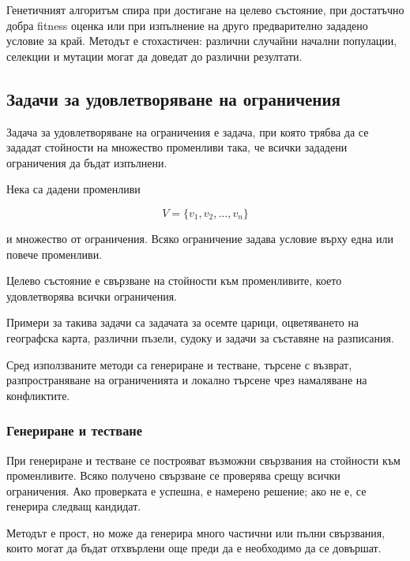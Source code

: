 Генетичният алгоритъм спира при достигане на целево състояние, при достатъчно добра fitness оценка или при изпълнение на друго предварително зададено условие за край. Методът е стохастичен: различни случайни начални популации, селекции и мутации могат да доведат до различни резултати.

\subsection{Задачи за удовлетворяване на ограничения}\label{s:25.1.5}

\begin{defn}
Задача за удовлетворяване на ограничения е задача, при която трябва да се зададат стойности на множество променливи така, че всички зададени ограничения да бъдат изпълнени.
\end{defn}

Нека са дадени променливи

\[
V=\{v_1,v_2,\ldots,v_n\}
\]

и множество от ограничения. Всяко ограничение задава условие върху една или повече променливи.

\begin{defn}
Целево състояние е свързване на стойности към променливите, което удовлетворява всички ограничения.
\end{defn}

Примери за такива задачи са задачата за осемте царици, оцветяването на географска карта, различни пъзели, судоку и задачи за съставяне на разписания.

Сред използваните методи са генериране и тестване, търсене с възврат, разпространяване на ограниченията и локално търсене чрез намаляване на конфликтите.

\subsubsection{Генериране и тестване}

При генериране и тестване се построяват възможни свързвания на стойности към променливите. Всяко получено свързване се проверява срещу всички ограничения. Ако проверката е успешна, е намерено решение; ако не е, се генерира следващ кандидат.

Методът е прост, но може да генерира много частични или пълни свързвания, които могат да бъдат отхвърлени още преди да е необходимо да се довършат.

